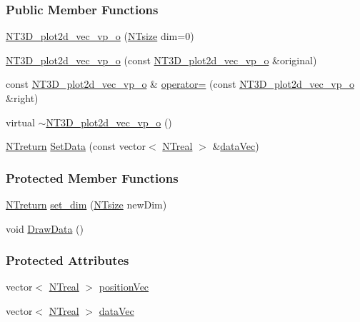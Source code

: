 \subsubsection*{Public Member Functions}
\begin{DoxyCompactItemize}
\item 
\hyperlink{class_n_t3_d__plot2d__vec__vp__o_ae5859e1bf60c6160dd4e9bc3d119f098}{NT3D\_\-plot2d\_\-vec\_\-vp\_\-o} (\hyperlink{nt__types_8h_a06c124f2e4469769b58230253ce0560b}{NTsize} dim=0)
\item 
\hyperlink{class_n_t3_d__plot2d__vec__vp__o_aec08e3f08e7bc0bf7d82589c6b27713c}{NT3D\_\-plot2d\_\-vec\_\-vp\_\-o} (const \hyperlink{class_n_t3_d__plot2d__vec__vp__o}{NT3D\_\-plot2d\_\-vec\_\-vp\_\-o} \&original)
\item 
const \hyperlink{class_n_t3_d__plot2d__vec__vp__o}{NT3D\_\-plot2d\_\-vec\_\-vp\_\-o} \& \hyperlink{class_n_t3_d__plot2d__vec__vp__o_a68898f5b96053df12fc40e0ebfd7d863}{operator=} (const \hyperlink{class_n_t3_d__plot2d__vec__vp__o}{NT3D\_\-plot2d\_\-vec\_\-vp\_\-o} \&right)
\item 
virtual \hyperlink{class_n_t3_d__plot2d__vec__vp__o_aebfb995380cdabb3623628053fdb7809}{$\sim$NT3D\_\-plot2d\_\-vec\_\-vp\_\-o} ()
\item 
\hyperlink{nt__types_8h_ab9564ee8f091e809d21b8451c6683c53}{NTreturn} \hyperlink{class_n_t3_d__plot2d__vec__vp__o_a7d91ae7280f584d166721296f9bbb7c8}{SetData} (const vector$<$ \hyperlink{nt__types_8h_a814a97893e9deb1eedcc7604529ba80d}{NTreal} $>$ \&\hyperlink{class_n_t3_d__plot2d__vec__vp__o_a85532c8a52e1a991a2da99c209d71fe7}{dataVec})
\end{DoxyCompactItemize}
\subsubsection*{Protected Member Functions}
\begin{DoxyCompactItemize}
\item 
\hyperlink{nt__types_8h_ab9564ee8f091e809d21b8451c6683c53}{NTreturn} \hyperlink{class_n_t3_d__plot2d__vec__vp__o_aa2cdf79a49b1c01f4653b673788848de}{set\_\-dim} (\hyperlink{nt__types_8h_a06c124f2e4469769b58230253ce0560b}{NTsize} newDim)
\item 
void \hyperlink{class_n_t3_d__plot2d__vec__vp__o_ad09307db9d86ed3affbd83540d42e3c4}{DrawData} ()
\end{DoxyCompactItemize}
\subsubsection*{Protected Attributes}
\begin{DoxyCompactItemize}
\item 
vector$<$ \hyperlink{nt__types_8h_a814a97893e9deb1eedcc7604529ba80d}{NTreal} $>$ \hyperlink{class_n_t3_d__plot2d__vec__vp__o_a3e0595deccf8ab69fad2bc3e99e2f1e3}{positionVec}
\item 
vector$<$ \hyperlink{nt__types_8h_a814a97893e9deb1eedcc7604529ba80d}{NTreal} $>$ \hyperlink{class_n_t3_d__plot2d__vec__vp__o_a85532c8a52e1a991a2da99c209d71fe7}{dataVec}
\end{DoxyCompactItemize}


